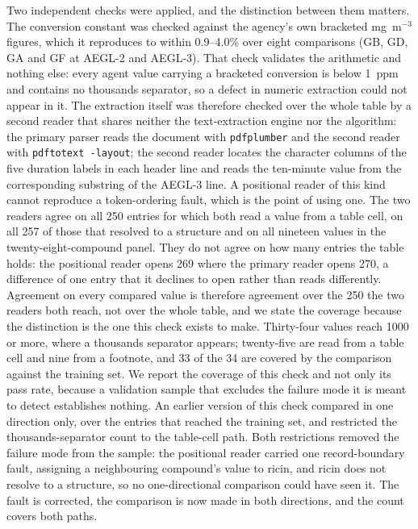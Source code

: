 \documentclass[11pt,a4paper]{article}
\begin{document}
Two independent checks were applied, and the distinction between them matters.
The conversion constant was checked against the agency's own bracketed
mg~m$^{-3}$ figures, which it reproduces to within 0.9--4.0\% over eight
comparisons (GB, GD, GA and GF at AEGL-2 and AEGL-3). That check validates the
arithmetic and nothing else: every agent value carrying a bracketed conversion is
below 1~ppm and contains no thousands separator, so a defect in numeric
extraction could not appear in it. The extraction itself was therefore checked
over the whole table by a second reader that shares neither the text-extraction
engine nor the algorithm: the primary parser reads the document with
\texttt{pdfplumber} and the second reader with \texttt{pdftotext -layout}; the
second reader locates
the character columns of the five duration labels in each header line and reads
the ten-minute value from the corresponding substring of the AEGL-3 line. A
positional reader of this kind cannot reproduce a token-ordering fault, which is
the point of using one. The two readers agree on all 250 entries for which both
read a value from a table cell, on all 257 of
those that resolved to a structure and on all nineteen values in the
twenty-eight-compound panel. They do not agree on how many entries the table
holds: the positional reader opens 269 where the primary reader opens 270, a
difference of one entry that it declines to open rather than reads differently.
Agreement on every compared value is therefore agreement over the 250 the two
readers both reach, not over the whole table, and we state the coverage because
the distinction is the one this check exists to make. Thirty-four values reach 1000 or more, where a
thousands separator appears; twenty-five are read from a table cell and nine
from a footnote, and 33 of the 34 are covered by the comparison against the
training set. We report the coverage of this check
and not only its pass rate, because a validation sample that excludes the failure
mode it is meant to detect establishes nothing. An earlier version of this check
compared in one direction only, over the entries that reached the training set,
and restricted the thousands-separator count to the table-cell path. Both
restrictions removed the failure mode from the sample: the positional reader
carried one record-boundary fault, assigning a neighbouring compound's value to
ricin, and ricin does not resolve to a structure, so no one-directional
comparison could have seen it. The fault is corrected, the comparison is now
made in both directions, and the count covers both paths.
\end{document}
